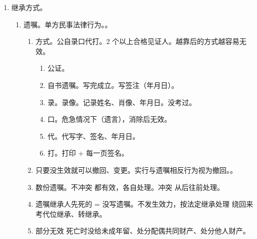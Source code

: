 \begin{enumerate}
\begin{enumerate}
          \item 丧失。绝对丧失。为了争遗产不择手段。考试常考。。
                \begin{enumerate}
                  \item 故意杀害被继承人。
                  \item 为争夺遗产而杀害其他继承人。
                  \item 遗弃、虐待被继承人情节严重。\sjt 对被继承人。
                  \item 伪造、篡改、隐匿、销毁遗嘱，情节严重。\xjt 对遗嘱。
                  \item 欺诈、胁迫手段迫使/妨碍被继承人设立、变更、撤回遗嘱，情节严重。
                \end{enumerate}
        \end{enumerate}
  \item 继承方式。
        \begin{enumerate}
          \item 遗嘱。单方民事法律行为。。
                \begin{enumerate}
                  \item 方式。公自录口代打。2 个以上合格见证人。越靠后的方式越容易无效。
                        \begin{enumerate}
                          \item 公证。
                          \item 自书遗嘱。写完成立。写签注（年月日）。
                          \item 录。录像。记录姓名、肖像、年月日。没考过。
                          \item 口。危急情况下（遗言），消除后无效。
                          \item 代。代写字、签名、年月日。
                          \item 打。打印 + 每一页签名。
                        \end{enumerate}
                  \item 只要没生效就可以撤回、变更。实行与遗嘱相反行为视为撤回。。
                  \item 数份遗嘱。\yi 不冲突 \yjt 都有效，各自处理。\er 冲突 \yjt 从后往前处理。
                  \item 遗嘱继承人先死的 = 没写遗嘱。不发生效力，按法定继承处理 \yjt 绕回来考代位继承、转继承。
                  \item 部分无效 \yjt 死亡时没给未成年留、处分配偶共同财产、处分他人财产。

\end{enumerate}
\end{enumerate}
\end{enumerate}
